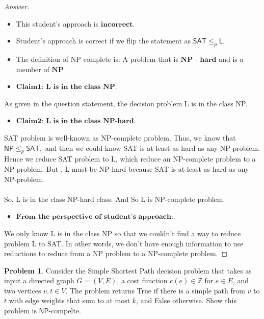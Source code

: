 \documentclass[11pt]{article}
\theoremstyle{definition}
\theoremstyle{definition}
\newtheorem{required}{Problem}
\theoremstyle{definition}
\begin{document}
\begin{proof}[Answer]
\begin{itemize}
\item This student's approach is $\textbf{incorrect}$.
\item Student's approach is correct if we flip the statement as $\textsf{SAT} \leq_{p} \textsf{L}.$
\item The definition of NP complete is: A problem that is $\textbf{NP - hard}$ and is a member of $\textbf{NP}$
\end{itemize}

\begin{itemize}
\item$\textbf{Claim1: L is in the class NP}$.
\end{itemize}
As given in the question statement, the decision problem L is in the class NP.
\begin{itemize}
\item$\textbf{Claim2: L is in the class NP-hard}$.
\end{itemize}
SAT problem is well-known as NP-complete problem. Thus, we know that $\textsf{NP} \leq_{p} \textsf{SAT},$ and then we could know SAT is at least as hard as any NP-problem.  Hence we reduce SAT problem to L, which reduce an NP-complete problem to a NP problem. But  , L must be NP-hard because SAT is at least as hard as any NP-problem.\\
\\So, L is in the class NP-hard class. And So L is NP-complete problem.


\begin{itemize}
\item$\textbf{From the perspective of student's approach:}$.
\end{itemize}
We only know L is in the class NP so that we couldn't find a way to reduce problem L to SAT. In other words, we don't have enough information to use reductions to reduce from a NP problem to a NP-complete problem.
\end{proof}



\newpage
\begin{required} \label{NPcomp}
Consider the Simple Shortest Path decision problem that takes as input a
directed graph $G=(V,E)$, a cost function $c(e)\in \mathbb{Z}$ for $e \in E$,
and two vertices $v,t\in V$. The problem returns True if there is a simple path from
$v$ to $t$ with edge weights that sum to at most $k$, and False otherwise.
Show this problem is $\textsf{NP}$-compelte.
\end{required}
\end{document}
